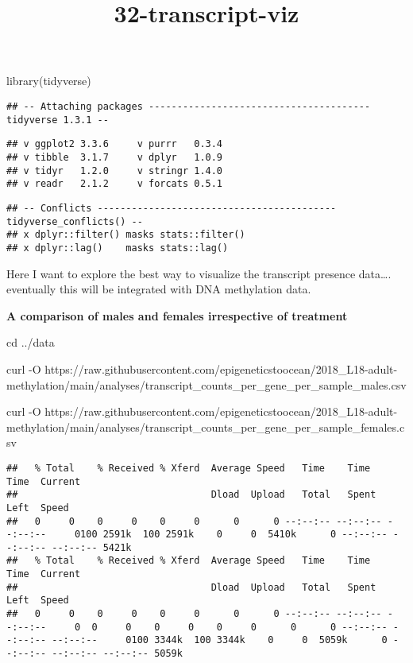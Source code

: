 \documentclass[
]{article}
\title{32-transcript-viz}
\author{}
\date{\vspace{-2.5em}}
\newenvironment{Shaded}{\begin{snugshade}}{\end{snugshade}}
\newcommand{\AttributeTok}[1]{\textcolor[rgb]{0.77,0.63,0.00}{#1}}
\newcommand{\BuiltInTok}[1]{#1}
\newcommand{\ExtensionTok}[1]{#1}
\newcommand{\FunctionTok}[1]{\textcolor[rgb]{0.00,0.00,0.00}{#1}}
\newcommand{\NormalTok}[1]{#1}
\begin{document}
\maketitle

\begin{Shaded}
\begin{Highlighting}[]
\FunctionTok{library}\NormalTok{(tidyverse)}
\end{Highlighting}
\end{Shaded}

\begin{verbatim}
## -- Attaching packages --------------------------------------- tidyverse 1.3.1 --
\end{verbatim}

\begin{verbatim}
## v ggplot2 3.3.6     v purrr   0.3.4
## v tibble  3.1.7     v dplyr   1.0.9
## v tidyr   1.2.0     v stringr 1.4.0
## v readr   2.1.2     v forcats 0.5.1
\end{verbatim}

\begin{verbatim}
## -- Conflicts ------------------------------------------ tidyverse_conflicts() --
## x dplyr::filter() masks stats::filter()
## x dplyr::lag()    masks stats::lag()
\end{verbatim}

Here I want to explore the best way to visualize the transcript presence
data\ldots. eventually this will be integrated with DNA methylation
data.

\textbf{A comparison of males and females irrespective of treatment}

\begin{Shaded}
\begin{Highlighting}[]
\BuiltInTok{cd}\NormalTok{ ../data}

\ExtensionTok{curl} \AttributeTok{{-}O}\NormalTok{ https://raw.githubusercontent.com/epigeneticstoocean/2018\_L18{-}adult{-}methylation/main/analyses/transcript\_counts\_per\_gene\_per\_sample\_males.csv}

\ExtensionTok{curl} \AttributeTok{{-}O}\NormalTok{ https://raw.githubusercontent.com/epigeneticstoocean/2018\_L18{-}adult{-}methylation/main/analyses/transcript\_counts\_per\_gene\_per\_sample\_females.csv}
\end{Highlighting}
\end{Shaded}

\begin{verbatim}
##   % Total    % Received % Xferd  Average Speed   Time    Time     Time  Current
##                                  Dload  Upload   Total   Spent    Left  Speed
##   0     0    0     0    0     0      0      0 --:--:-- --:--:-- --:--:--     0100 2591k  100 2591k    0     0  5410k      0 --:--:-- --:--:-- --:--:-- 5421k
##   % Total    % Received % Xferd  Average Speed   Time    Time     Time  Current
##                                  Dload  Upload   Total   Spent    Left  Speed
##   0     0    0     0    0     0      0      0 --:--:-- --:--:-- --:--:--     0  0     0    0     0    0     0      0      0 --:--:-- --:--:-- --:--:--     0100 3344k  100 3344k    0     0  5059k      0 --:--:-- --:--:-- --:--:-- 5059k
\end{verbatim}
\end{document}
